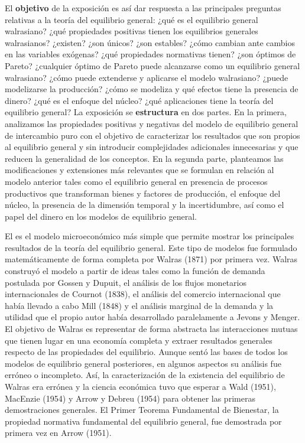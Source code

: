 \documentclass{nuevotema}
\begin{document}
El \textbf{objetivo} de la exposición es así dar respuesta a las principales preguntas relativas a la teoría del equilibrio general: ¿qué es el equilibrio general walrasiano? ¿qué propiedades positivas tienen los equilibrios generales walrasianos? ¿existen? ¿son únicos? ¿son estables? ¿cómo cambian ante cambios en las variables exógenas? ¿qué propiedades normativas tienen? ¿son óptimos de Pareto? ¿cualquier óptimo de Pareto puede alcanzarse como un equilibrio general walrasiano? ¿cómo puede extenderse y aplicarse el modelo walrasiano? ¿puede modelizarse la producción? ¿cómo se modeliza y qué efectos tiene la presencia de dinero? ¿qué es el enfoque del núcleo? ¿qué aplicaciones tiene la teoría del equilibrio general? La exposición se \textbf{estructura} en dos partes. En la primera, analizamos las propiedades positivas y negativas del modelo de equilibrio general de intercambio puro con el objetivo de caracterizar los resultados que son propios al equilibrio general y sin introducir complejidades adicionales innecesarias y que reducen la generalidad de los conceptos. En la segunda parte, planteamos las modificaciones y extensiones más relevantes que se formulan en relación al modelo anterior tales como el equilibrio general en presencia de procesos productivos que transforman bienes y factores de producción, el enfoque del núcleo, la presencia de la dimensión temporal y la incertidumbre, así como el papel del dinero en los modelos de equilibrio general.

El  es el modelo microeconómico más simple que permite mostrar los principales resultados de la teoría del equilibrio general. Este tipo de modelos fue formulado matemáticamente de forma completa por Walras (1871) por primera vez. Walras construyó el modelo a partir de ideas tales como la función de demanda postulada por Gossen y Dupuit, el análisis de los flujos monetarios internacionales de Cournot (1838), el análisis del comercio internacional que había llevado a cabo Mill (1848) y el análisis marginal de la demanda y la utilidad que el propio autor había desarrollado paralelamente a Jevons y Menger. El objetivo de Walras es representar de forma abstracta las interacciones mutuas que tienen lugar en una economía completa y extraer resultados generales respecto de las propiedades del equilibrio. Aunque sentó las bases de todos los modelos de equilibrio general posteriores, en algunos aspectos su análisis fue erróneo o incompleto. Así, la caracterización de la existencia del equilibrio de Walras era errónea y la ciencia económica tuvo que esperar a Wald (1951), MacEnzie (1954) y Arrow y Debreu (1954) para obtener las primeras demostraciones generales. El Primer Teorema Fundamental de Bienestar, la propiedad normativa fundamental del equilibrio general, fue demostrada por primera vez en Arrow (1951).
\end{document}
